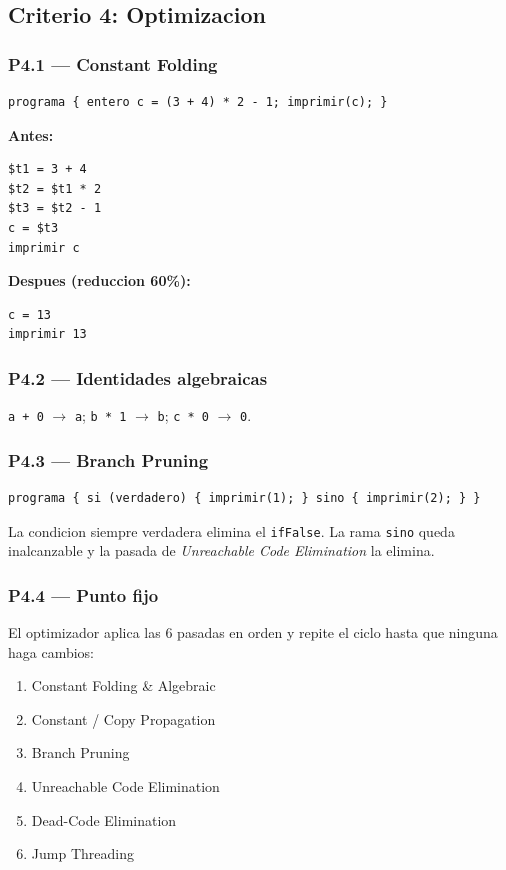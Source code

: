 \documentclass[11pt,a4paper]{article}
\begin{document}
\subsection{Criterio 4: Optimizacion}

\subsubsection{P4.1 --- Constant Folding}
\begin{lstlisting}[style=ml]
programa { entero c = (3 + 4) * 2 - 1; imprimir(c); }
\end{lstlisting}

\textbf{Antes:}
\begin{lstlisting}[style=tac]
$t1 = 3 + 4
$t2 = $t1 * 2
$t3 = $t2 - 1
c = $t3
imprimir c
\end{lstlisting}

\textbf{Despues (reduccion 60\%):}
\begin{lstlisting}[style=tac]
c = 13
imprimir 13
\end{lstlisting}

\subsubsection{P4.2 --- Identidades algebraicas}
\texttt{a + 0} $\rightarrow$ \texttt{a}; \texttt{b * 1} $\rightarrow$
\texttt{b}; \texttt{c * 0} $\rightarrow$ \texttt{0}.

\subsubsection{P4.3 --- Branch Pruning}
\begin{lstlisting}[style=ml]
programa { si (verdadero) { imprimir(1); } sino { imprimir(2); } }
\end{lstlisting}
La condicion siempre verdadera elimina el \texttt{ifFalse}. La rama
\texttt{sino} queda inalcanzable y la pasada de \emph{Unreachable Code
Elimination} la elimina.

\subsubsection{P4.4 --- Punto fijo}

El optimizador aplica las 6 pasadas en orden y repite el ciclo hasta
que ninguna haga cambios:
\begin{enumerate}[leftmargin=*,nosep]
  \item Constant Folding \& Algebraic
  \item Constant / Copy Propagation
  \item Branch Pruning
  \item Unreachable Code Elimination
  \item Dead-Code Elimination
  \item Jump Threading
\end{enumerate}
\end{document}
